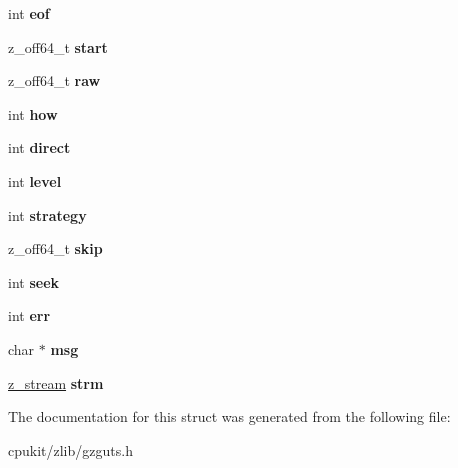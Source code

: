 \begin{DoxyCompactItemize}
\mbox{\label{structgz__state_ae50ffc823858bc4f909e3d9507356f92}} 
int {\bfseries eof}
\item 
\mbox{\label{structgz__state_a0eb95c1935a32c508a1e6fc1e84c8f83}} 
z\+\_\+off64\+\_\+t {\bfseries start}
\item 
\mbox{\label{structgz__state_ae32599fda854ec0d1aee2ce1c72c5afc}} 
z\+\_\+off64\+\_\+t {\bfseries raw}
\item 
\mbox{\label{structgz__state_ac6e4b7db699aacd089f6d55b01483d6f}} 
int {\bfseries how}
\item 
\mbox{\label{structgz__state_a114c6a0de43039853ead48a092792a7d}} 
int {\bfseries direct}
\item 
\mbox{\label{structgz__state_aaf5e13a32b8618cde112e4312d480137}} 
int {\bfseries level}
\item 
\mbox{\label{structgz__state_a2777c46311012def486c2aa720fe5203}} 
int {\bfseries strategy}
\item 
\mbox{\label{structgz__state_a4bc336eac6a48fd0f2645e672e5c6c13}} 
z\+\_\+off64\+\_\+t {\bfseries skip}
\item 
\mbox{\label{structgz__state_ab60b82012b8193c3f44b2e48974b9dd9}} 
int {\bfseries seek}
\item 
\mbox{\label{structgz__state_aa9832eb9300c065f6572e5699ab27938}} 
int {\bfseries err}
\item 
\mbox{\label{structgz__state_ad49f321739e10ff0387a0e7fe31c6538}} 
char $\ast$ {\bfseries msg}
\item 
\mbox{\label{structgz__state_a77df647f4deba86cc8a4fa0a01a08f4e}} 
\mbox{\hyperlink{structz__stream__s}{z\+\_\+stream}} {\bfseries strm}
\end{DoxyCompactItemize}


The documentation for this struct was generated from the following file\+:\begin{DoxyCompactItemize}
\item 
cpukit/zlib/gzguts.\+h\end{DoxyCompactItemize}
